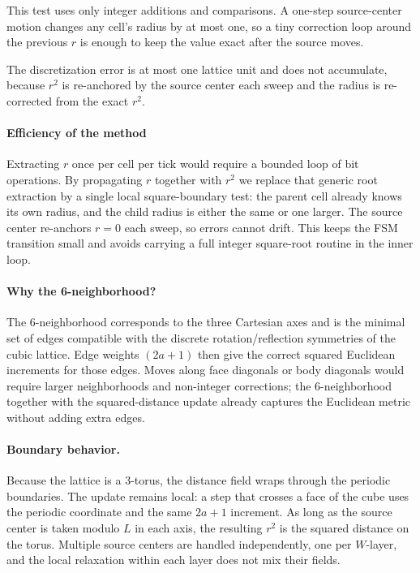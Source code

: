 \documentclass{ijuc}
\begin{document}
This test uses only integer additions and comparisons. 
A one-step source-center motion changes any cell's radius by at most one, 
so a tiny correction loop around the previous $r$ is enough to keep the value exact after the source moves.

The discretization error is at most one lattice unit and does not accumulate, 
because $r^{2}$ is re-anchored by the source center each sweep 
and the radius is re-corrected from the exact $r^{2}$.

\paragraph{Efficiency of the method}
Extracting $r$ once per cell per tick would require a bounded loop of bit operations. 
By propagating $r$ together with $r^{2}$ we replace that generic root extraction 
by a single local square-boundary test: the parent cell already knows its own radius, 
and the child radius is either the same or one larger. 
The source center re-anchors $r=0$ each sweep, so errors cannot drift. 
This keeps the FSM transition small and avoids carrying a full integer square-root routine in the inner loop.

\paragraph{Why the 6-neighborhood?}
The 6-neighborhood corresponds to the three Cartesian axes and is the minimal set of edges compatible with the discrete rotation/reflection symmetries of the cubic lattice.  Edge weights $(2a+1)$ then give the correct squared Euclidean increments for those edges.  Moves along face diagonals or body diagonals would require larger neighborhoods and non-integer corrections; the 6-neighborhood together with the squared-distance update already captures the Euclidean metric without adding extra edges.

\paragraph{Boundary behavior.}
Because the lattice is a 3-torus, the distance field wraps through the periodic boundaries.  The update remains local: a step that crosses a face of the cube uses the periodic coordinate and the same $2a+1$ increment.  As long as the source center is taken modulo $L$ in each axis, the resulting $r^{2}$ is the squared distance on the torus.  Multiple source centers are handled independently, one per $W$-layer, and the local relaxation within each layer does not mix their fields.
\end{document}
